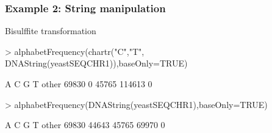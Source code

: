 \documentclass{beamer}
\begin{document}

\begin{frame}[fragile]
\frametitle{Example 2: String manipulation}
  \bit
      \item Bisulffite transformation
          \begin{uncoverenv}
\begin{Schunk}
\begin{Sinput}
> alphabetFrequency(chartr("C","T", DNAString(yeastSEQCHR1)),baseOnly=TRUE)
\end{Sinput}
\begin{Soutput}
     A      C      G      T  other 
 69830      0  45765 114613      0 
\end{Soutput}
\begin{Sinput}
> alphabetFrequency(DNAString(yeastSEQCHR1),baseOnly=TRUE)
\end{Sinput}
\begin{Soutput}
    A     C     G     T other 
69830 44643 45765 69970     0 
\end{Soutput}
\end{Schunk}
          \end{uncoverenv} 
  \eit
\end{frame}

\end{document}

